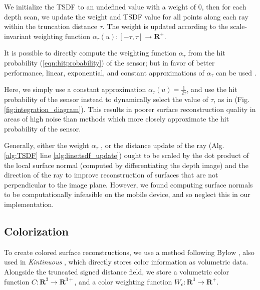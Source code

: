 \documentclass[10pt,twocolumn,letterpaper]{article}
\newcommand{\eref}[1]{(\ref{#1})}
\newcommand{\figref}[1]{Fig.\ref{#1}}
\newcommand{\algoref}[1]{Alg.\ref{#1}}
\begin{document}
We initialize the TSDF to an undefined value with a
weight of $0$, then for each depth scan, we update the weight and TSDF value
for all points along each ray within the truncation distance $\tau$. The weight
is updated according to the scale-invariant weighting function $\alpha_{\tau}(u)
:[-\tau,\tau]\to \mathbf{R^{+}} $.

% 
%  

 It is possible \cite{Nguyen2012} to directly compute the weighting function
 $\alpha_{\tau}$ from the hit probability \eref{eqn:hitprobability} of the
 sensor; but in favor of better performance, linear, exponential, and constant
 approximations of $\alpha_{\tau}$ can be used \cite{Curless1996, Newcombe,
 Whelan2013, Bylow2013}.

Here, we simply use a constant approximation $\alpha_{\tau}(u) = \frac{1}{2
\tau}$, and use the hit probability of the sensor instead to  dynamically select
the value of $\tau$, as in \cite{Nguyen2012} (\figref{fig:integration_diagram}).
This results in poorer surface reconstruction quality in areas of high noise
than methods which more closely approximate the hit probability of the sensor.

Generally, either the weight $\alpha_{\tau}$ \cite{Newcombe, Whelan2013}, or
the distance update of the ray (\algoref{alg:TSDF} line
\ref{alg:line:tsdf_update}) \cite{Curless1996, Bylow2013} ought to be scaled by
the dot product of the local surface normal (computed by differentiating the
depth image) and the direction of the ray to improve reconstruction of surfaces
that are not perpendicular to the image plane. However, we found computing
surface normals to be computationally infeasible on the mobile device, and so
neglect this in our implementation.

\subsection{Colorization}
\label{section:color}
To create colored surface reconstructions, we use a method following Bylow
\etal \cite{Bylow2013}, also used in \textit{Kintinuous} \cite{Whelan2013},
which directly stores color information as volumetric data. Alongside the
truncated signed distance field, we store a volumetric color function
$C : \mathbf{R}^3 \to \mathbf{R}^{3+}$, and a color weighting function
$W_{c} :
\mathbf{R}^3 \to \mathbf{R^{+}}$.
\end{document}
